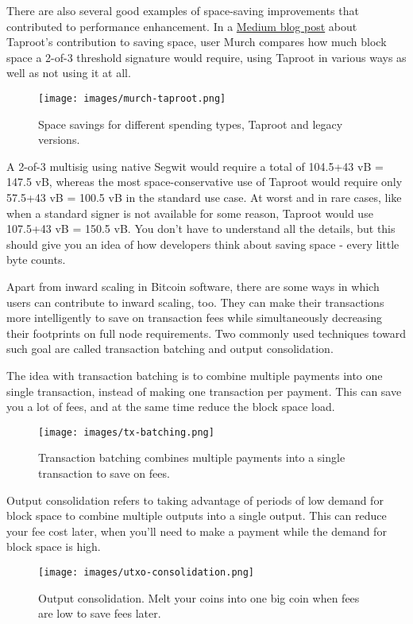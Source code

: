 There are also several good examples of space-saving improvements that
contributed to performance enhancement. In a
\href{https://murchandamus.medium.com/2-of-3-multisig-inputs-using-pay-to-taproot-d5faf2312ba3}{Medium
blog post} about Taproot's contribution to saving space, user Murch
compares how much block space a 2-of-3 threshold signature would
require, using Taproot in various ways as well as not using it at all.

\begin{figure}
\centering
\texttt{[image: images/murch-taproot.png]}
\caption{Space savings for different spending types, Taproot and legacy
versions.}
\end{figure}

A 2-of-3 multisig using native Segwit would require a total of 104.5+43
vB = 147.5 vB, whereas the most space-conservative use of Taproot would
require only 57.5+43 vB = 100.5 vB in the standard use case. At worst
and in rare cases, like when a standard signer is not available for some
reason, Taproot would use 107.5+43 vB = 150.5 vB. You don't have to
understand all the details, but this should give you an idea of how
developers think about saving space - every little byte counts.

Apart from inward scaling in Bitcoin software, there are some ways in
which users can contribute to inward scaling, too. They can make their
transactions more intelligently to save on transaction fees while
simultaneously decreasing their footprints on full node requirements.
Two commonly used techniques toward such goal are called transaction
batching and output consolidation.

The idea with transaction batching is to combine multiple payments into
one single transaction, instead of making one transaction per payment.
This can save you a lot of fees, and at the same time reduce the block
space load.

\begin{figure}
\centering
\texttt{[image: images/tx-batching.png]}
\caption{Transaction batching combines multiple payments into a single
transaction to save on fees.}
\end{figure}

Output consolidation refers to taking advantage of periods of low demand
for block space to combine multiple outputs into a single output. This
can reduce your fee cost later, when you'll need to make a payment while
the demand for block space is high.

\begin{figure}
\centering
\texttt{[image: images/utxo-consolidation.png]}
\caption{Output consolidation. Melt your coins into one big coin when
fees are low to save fees later.}
\end{figure}

